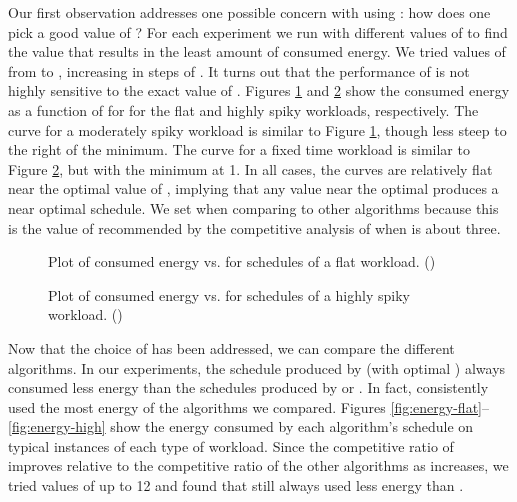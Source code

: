 \documentclass[11pt]{article}
\newcommand{\mycomment}[1]{ }
\begin{document}
Our first observation addresses one possible concern with using :
how does one pick a good value of ?
For each experiment we run  with
different values of  to find the value that results in the least
amount of consumed energy. We tried values of  from  to ,
increasing in steps of .
It turns out that the performance of  is not highly
sensitive to the exact value of .
Figures \ref{fig:q_Flat} and \ref{fig:q_High} show the consumed
energy as a function of  for  for the flat and
highly spiky workloads, respectively.
The curve for a moderately spiky workload is similar to Figure
\ref{fig:q_Flat}, though less steep to the right of the minimum.
The curve for a fixed time workload is similar to Figure
\ref{fig:q_High}, but with the minimum at 1.
In all cases, the curves are relatively flat near the optimal value of
, implying that any value near the optimal  produces a near
optimal schedule. We set  when comparing  to other algorithms
because this is the value of  recommended by the competitive analysis of
 when  is about three.

\begin{figure}
\centering
{}
\caption{Plot of consumed energy vs.  for  schedules of a flat
  workload. ()}
\label{fig:q_Flat}
\end{figure}

\mycomment{
\begin{figure}
\centering
\epsfig{file=figs/q_moderate1.eps, scale=.6}
\caption{Plot of consumed energy vs.  for  schedules of a
  moderately spiky workload. ()}
\label{fig:q_Moderate}
\end{figure}
}

\mycomment{
\begin{figure}
\centering
\epsfig{file=figs/q_fixed1.eps, scale=0.6}
\caption{Plot of consumed energy vs.  for  schedules of a
  fixed time workload. ()}
\label{fig:q_Fixed}
\end{figure}
}

\begin{figure}
\centering
{}
\caption{Plot of consumed energy vs.  for  schedules of a
  highly spiky workload. ()}
\label{fig:q_High}
\end{figure}

Now that the choice of  has been addressed, we can compare
the different algorithms.
In our experiments, the schedule produced by  (with optimal )
always consumed less energy than the schedules produced by 
 or .
In fact,  consistently used the most energy of the algorithms we
compared.
Figures \ref{fig:energy-flat}--\ref{fig:energy-high} show the energy
consumed by each algorithm's schedule on typical instances of each
type of workload.
Since the competitive ratio of  improves relative to the
competitive ratio of the other algorithms as  increases,
we tried values of  up to 12 and found
that  still always used less energy than .
\end{document}
